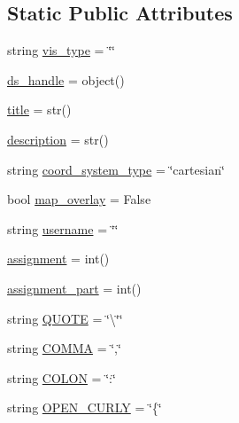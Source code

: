 \subsection*{Static Public Attributes}
\begin{DoxyCompactItemize}
\item 
string \mbox{\hyperlink{class_bridges_1_1_bridges_1_1_bridges_a27bc30c5de41aa3495c25ad7ee9a07f7}{vis\+\_\+type}} = \char`\"{}\char`\"{}
\item 
\mbox{\hyperlink{class_bridges_1_1_bridges_1_1_bridges_afee10c9edbc16626444a67f5aa847593}{ds\+\_\+handle}} = object()
\item 
\mbox{\hyperlink{class_bridges_1_1_bridges_1_1_bridges_a977ab3147c2a675bfd78dd199a9644ec}{title}} = str()
\item 
\mbox{\hyperlink{class_bridges_1_1_bridges_1_1_bridges_a11a96ac7da5095bbbe357c67521660b5}{description}} = str()
\item 
string \mbox{\hyperlink{class_bridges_1_1_bridges_1_1_bridges_ac3a61fdcc5140d0bb81b2f03fcf314c7}{coord\+\_\+system\+\_\+type}} = \char`\"{}cartesian\char`\"{}
\item 
bool \mbox{\hyperlink{class_bridges_1_1_bridges_1_1_bridges_a0e53d33349e4dfb6307947d4a761057d}{map\+\_\+overlay}} = False
\item 
string \mbox{\hyperlink{class_bridges_1_1_bridges_1_1_bridges_a4b2e284c3e910633af57a02fe73cc714}{username}} = \char`\"{}\char`\"{}
\item 
\mbox{\hyperlink{class_bridges_1_1_bridges_1_1_bridges_a33719976eb816d13f632e9342d31b718}{assignment}} = int()
\item 
\mbox{\hyperlink{class_bridges_1_1_bridges_1_1_bridges_ae654b7f3bf01b66a13e72035309502c5}{assignment\+\_\+part}} = int()
\item 
string \mbox{\hyperlink{class_bridges_1_1_bridges_1_1_bridges_afad910c4cafccab64f5dc4cce8668507}{Q\+U\+O\+TE}} = \char`\"{}\textbackslash{}\char`\"{}\char`\"{}
\item 
string \mbox{\hyperlink{class_bridges_1_1_bridges_1_1_bridges_a8ab95ee4bc36d93b78f3ebb8a55e9b27}{C\+O\+M\+MA}} = \char`\"{},\char`\"{}
\item 
string \mbox{\hyperlink{class_bridges_1_1_bridges_1_1_bridges_a0606ce0192b51d878e54a7d5ed639fcb}{C\+O\+L\+ON}} = \char`\"{}\+:\char`\"{}
\item 
string \mbox{\hyperlink{class_bridges_1_1_bridges_1_1_bridges_ad26eb626e32645acd1df4b7151fb80c5}{O\+P\+E\+N\+\_\+\+C\+U\+R\+LY}} = \char`\"{}\{\char`\"{}
\item 

\end{DoxyCompactItemize}

